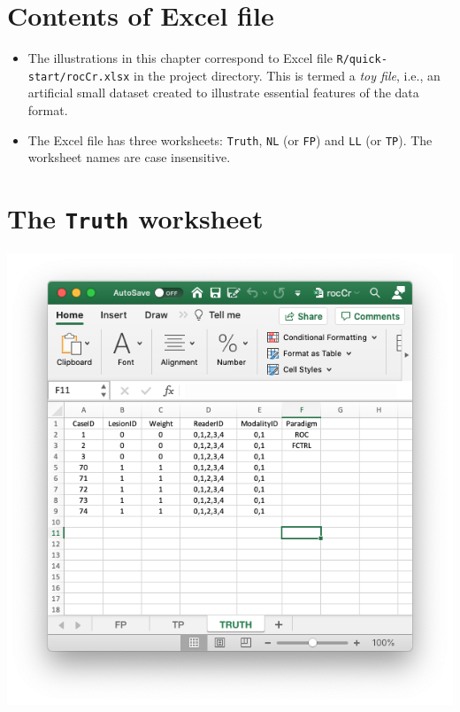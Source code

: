 \documentclass[
]{book}
\providecommand{\tightlist}{%
  \setlength{\itemsep}{0pt}\setlength{\parskip}{0pt}}
\begin{document}
\hypertarget{quick-start-data-format-contents}{%
\section{Contents of Excel file}\label{quick-start-data-format-contents}}

\begin{itemize}
\tightlist
\item
  The illustrations in this chapter correspond to Excel file \texttt{R/quick-start/rocCr.xlsx} in the project directory. This is termed a \emph{toy file}, i.e., an artificial small dataset created to illustrate essential features of the data format.
\item
  The Excel file has three worksheets: \texttt{Truth}, \texttt{NL} (or \texttt{FP}) and \texttt{LL} (or \texttt{TP}). The worksheet names are case insensitive.
\end{itemize}

\hypertarget{quick-start-data-format-truth-worksheet}{%
\section{\texorpdfstring{The \texttt{Truth} worksheet}{The Truth worksheet}}\label{quick-start-data-format-truth-worksheet}}

\includegraphics[width=1\textwidth,height=\textheight]{images/quick-start/rocCrTruth.png}
\end{document}

